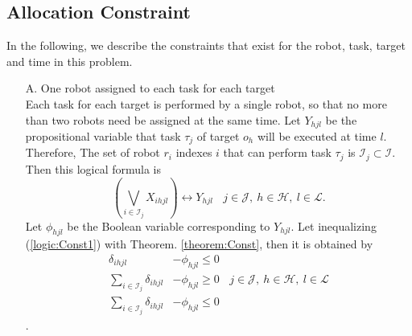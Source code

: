 \documentclass[]{interact}
\theoremstyle{plain}%
\theoremstyle{definition}
\theoremstyle{remark}
\begin{document}
\subsection{Allocation Constraint}
In the following, we describe the constraints that exist for the robot, task, target and time in this problem.

\begin{itemize}
    \item[A.] One robot assigned to each task for each target\label{Const:A} \mbox{}\\
            Each task for each target is performed by a single robot, so that no more than two robots need be assigned at the same time.
            Let $Y_{hjl}$ be the propositional variable that task $\tau_j$ of target $o_h$ will be executed at time $l$. 
            Therefore, The set of robot $r_i$ indexes $i$ that can perform task $\tau_j$ is $\mathcal{I}_j\subset\mathcal{I}$.
            Then this logical formula is 
            \begin{equation}\label{logic:Const1}
                \left(\bigvee_{i\in\mathcal{I}_j}X_{ihjl}\right)\leftrightarrow Y_{hjl}~~~~j\in\mathcal{J},~h\in\mathcal{H},~l\in\mathcal{L}.
            \end{equation}
            Let $\phi_{hjl}$ be the Boolean variable corresponding to $Y_{hjl}$.
            Let inequalizing (\ref{logic:Const1}) with Theorem. \ref{theorem:Const}, then it is obtained by
            \begin{align}
                \label{eq:Const1_1}\delta_{ihjl}&-\phi_{hjl}\le 0 \\
                \label{eq:Const1_2}\sum_{i\in\mathcal{I}_j}\delta_{ihjl}&-\phi_{hjl} \ge 0~~~~j\in\mathcal{J},~h\in\mathcal{H},~l\in\mathcal{L}\\
                \label{eq:Const1_3}\sum_{i\in\mathcal{I}_j}\delta_{ihjl}&-\phi_{hjl} \le 0
            \end{align}.


\end{itemize}
\end{document}
